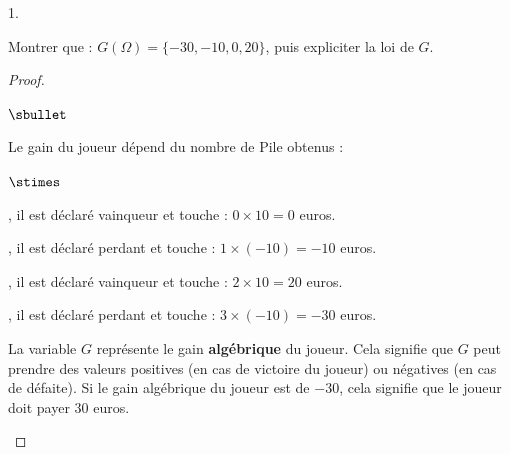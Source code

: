 \begin{noliste}{1.}
\item Montrer que : $G(\Omega) = \{-30, -10, 0, 20\}$, puis expliciter
  la loi de $G$.

  \begin{proof}~%
    \begin{noliste}{$\sbullet$}
    \item Le gain du joueur dépend du nombre de Pile obtenus : 
      \begin{noliste}{$\stimes$}
      \item {}, il est déclaré
        vainqueur et touche : $0 \times 10 = 0$ euros.

      \item {}, il est déclaré
        perdant et touche : $1 \times (-10) = -10$ euros.

      \item {}, il est déclaré
        vainqueur et touche : $2 \times 10 = 20$ euros.

      \item {}, il est déclaré
        perdant et touche : $3 \times (-10) = -30$ euros.
      \end{noliste}
      \begin{remark}%
        La variable $G$ représente le gain {\bf algébrique} du
        joueur. Cela signifie que $G$ peut prendre des valeurs
        positives (en cas de victoire du joueur) ou négatives (en cas
        de défaite). Si le gain algébrique du joueur est de $-30$,
        cela signifie que le joueur doit payer $30$ euros.
      \end{remark}


      \newpage



\end{noliste}
\end{proof}
\end{noliste}
